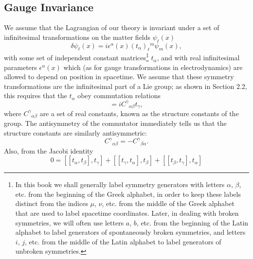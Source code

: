 
\subsection{Gauge Invariance}
\label{sec:15.1}

We assume that the Lagrangian of our theory is invariant under a set of
infinitesimal transformations on the matter fields $\psi_\ell(x)$
\begin{equation}
 \delta\psi_\ell(x)=i\epsilon^\alpha(x)(t_\alpha)_\ell{}^m\psi_m(x) ,
 \tag{15.1.1}\label{eq:15.1.1}
\end{equation}
with some set of independent constant matrices\footnote{In this book we shall
generally label symmetry generators with letters $\alpha$, $\beta$, etc. from the
beginning of the Greek alphabet, in order to keep these labels distinct from the
indices $\mu$, $\nu$, etc. from the middle of the Greek alphabet that are used to
label spacetime coordinates. Later, in dealing with broken symmetries, we will
often use letters $a$, $b$, etc. from the beginning of the Latin alphabet to label
generators of spontaneously broken symmetries, and letters $i$, $j$, etc. from the
middle of the Latin alphabet to label generators of unbroken symmetries.}
$t_\alpha$, and with real infinitesimal parameters $\epsilon^\alpha(x)$ which (as
for gauge transformations in electrodynamics) are allowed to depend on position
in spacetime. We assume that these symmetry transformations are the infinitesimal
part of a Lie group; as shown in Section 2.2, this requires that the $t_\alpha$
obey commutation relations
\begin{equation}
 [t_\alpha,t_\beta]=iC^\gamma{}_{\alpha\beta}t_\gamma ,
 \tag{15.1.2}\label{eq:15.1.2}
\end{equation}
where $C^\gamma{}_{\alpha\beta}$ are a set of real constants, known as the
structure constants of the group. The antisymmetry of the commutator immediately
tells us that the structure constants are similarly antisymmetric:
\begin{equation}
 C^\gamma{}_{\alpha\beta}=-C^\gamma{}_{\beta\alpha} .
 \tag{15.1.3}\label{eq:15.1.3}
\end{equation}
Also, from the Jacobi identity
\begin{equation}
 0=[[t_\alpha,t_\beta],t_\gamma]+[[t_\gamma,t_\alpha],t_\beta]
   +[[t_\beta,t_\gamma],t_\alpha]
 \tag{15.1.4}\label{eq:15.1.4}
\end{equation}
